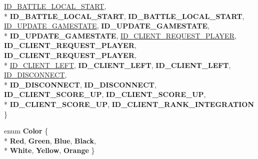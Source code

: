\begin{DoxyCompactItemize}
\hyperlink{namespace_champ_net_plugin_a2ade5cfa7cf6c25ab7236c6b54a57821ab54454887b51006a69a632ca6a13aab6}{I\-D\-\_\-\-B\-A\-T\-T\-L\-E\-\_\-\-L\-O\-C\-A\-L\-\_\-\-S\-T\-A\-R\-T}, 
\\*
{\bfseries I\-D\-\_\-\-B\-A\-T\-T\-L\-E\-\_\-\-L\-O\-C\-A\-L\-\_\-\-S\-T\-A\-R\-T}, 
{\bfseries I\-D\-\_\-\-B\-A\-T\-T\-L\-E\-\_\-\-L\-O\-C\-A\-L\-\_\-\-S\-T\-A\-R\-T}, 
\hyperlink{namespace_champ_net_plugin_a2ade5cfa7cf6c25ab7236c6b54a57821a6c390584862af2434c946e375365fe02}{I\-D\-\_\-\-U\-P\-D\-A\-T\-E\-\_\-\-G\-A\-M\-E\-S\-T\-A\-T\-E}, 
{\bfseries I\-D\-\_\-\-U\-P\-D\-A\-T\-E\-\_\-\-G\-A\-M\-E\-S\-T\-A\-T\-E}, 
\\*
{\bfseries I\-D\-\_\-\-U\-P\-D\-A\-T\-E\-\_\-\-G\-A\-M\-E\-S\-T\-A\-T\-E}, 
\hyperlink{namespace_champ_net_plugin_a2ade5cfa7cf6c25ab7236c6b54a57821a95ea635e1f4775e77d635b7039a9711e}{I\-D\-\_\-\-C\-L\-I\-E\-N\-T\-\_\-\-R\-E\-Q\-U\-E\-S\-T\-\_\-\-P\-L\-A\-Y\-E\-R}, 
{\bfseries I\-D\-\_\-\-C\-L\-I\-E\-N\-T\-\_\-\-R\-E\-Q\-U\-E\-S\-T\-\_\-\-P\-L\-A\-Y\-E\-R}, 
{\bfseries I\-D\-\_\-\-C\-L\-I\-E\-N\-T\-\_\-\-R\-E\-Q\-U\-E\-S\-T\-\_\-\-P\-L\-A\-Y\-E\-R}, 
\\*
\hyperlink{namespace_champ_net_plugin_a2ade5cfa7cf6c25ab7236c6b54a57821a170a6a655b34086567c4039a8e9ba81d}{I\-D\-\_\-\-C\-L\-I\-E\-N\-T\-\_\-\-L\-E\-F\-T}, 
{\bfseries I\-D\-\_\-\-C\-L\-I\-E\-N\-T\-\_\-\-L\-E\-F\-T}, 
{\bfseries I\-D\-\_\-\-C\-L\-I\-E\-N\-T\-\_\-\-L\-E\-F\-T}, 
\hyperlink{namespace_champ_net_plugin_a2ade5cfa7cf6c25ab7236c6b54a57821ab64ca706dd3c8029ea9dc9a239237e15}{I\-D\-\_\-\-D\-I\-S\-C\-O\-N\-N\-E\-C\-T}, 
\\*
{\bfseries I\-D\-\_\-\-D\-I\-S\-C\-O\-N\-N\-E\-C\-T}, 
{\bfseries I\-D\-\_\-\-D\-I\-S\-C\-O\-N\-N\-E\-C\-T}, 
{\bfseries I\-D\-\_\-\-C\-L\-I\-E\-N\-T\-\_\-\-S\-C\-O\-R\-E\-\_\-\-U\-P}, 
{\bfseries I\-D\-\_\-\-C\-L\-I\-E\-N\-T\-\_\-\-S\-C\-O\-R\-E\-\_\-\-U\-P}, 
\\*
{\bfseries I\-D\-\_\-\-C\-L\-I\-E\-N\-T\-\_\-\-S\-C\-O\-R\-E\-\_\-\-U\-P}, 
{\bfseries I\-D\-\_\-\-C\-L\-I\-E\-N\-T\-\_\-\-R\-A\-N\-K\-\_\-\-I\-N\-T\-E\-G\-R\-A\-T\-I\-O\-N}
 \}
\item 
enum {\bfseries Color} \{ \\*
{\bfseries Red}, 
{\bfseries Green}, 
{\bfseries Blue}, 
{\bfseries Black}, 
\\*
{\bfseries White}, 
{\bfseries Yellow}, 
{\bfseries Orange}
 \}
\end{DoxyCompactItemize}
